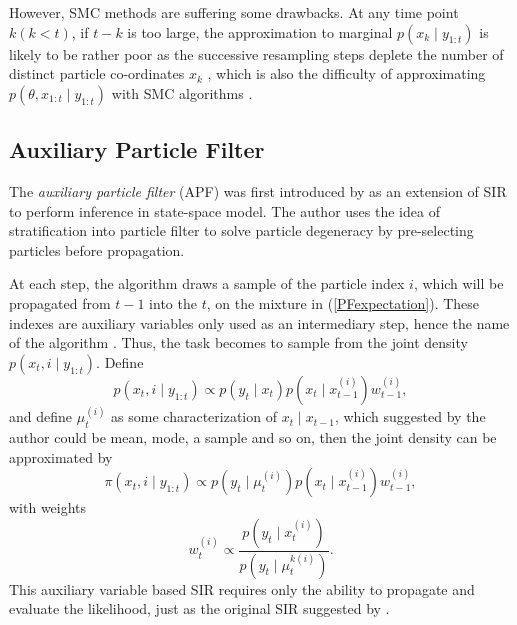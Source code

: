 However, SMC methods are suffering some drawbacks. At any time point $k (k<t)$, if $t-k$ is too large, the approximation to marginal $p(x_k\mid y_{1:t})$ is likely to be rather poor as the successive resampling steps deplete the number of distinct particle co-ordinates $x_k$ \citep{andrieu2010particle}, which is also the difficulty of approximating $p(\theta,x_{1:t}\mid y_{1:t})$ with SMC algorithms 
\citep{andrieu1999sequential, fearnhead2002markov, storvik2002particle}. 




\subsection{Auxiliary Particle Filter}

The \textit{auxiliary particle filter} (APF) was first introduced by \cite{pitt1999filtering} as an extension of SIR to perform inference in state-space model. The author uses the idea of stratification into particle filter to solve particle degeneracy by pre-selecting particles before propagation. 

At each step, the algorithm draws a sample of the particle index $i$, which will be propagated from $t-1$ into the $t$, on the mixture in (\ref{PFexpectation}). These indexes are auxiliary variables only used as an intermediary step, hence the name of the algorithm \citep{pitt1999filtering}. Thus, the task becomes to sample from the joint density $p(x_t,i\mid y_{1:t})$. Define 
\begin{equation}
p(x_t,i\mid y_{1:t})\propto p(y_t\mid x_t)p\left(x_t\mid x_{t-1}^{(i)}\right) w_{t-1}^{(i)}, 
\end{equation}
and define $\mu_t^{(i)}$ as some characterization of $x_t\mid x_{t-1}$, which suggested by the author could be mean, mode, a sample and so on, then the joint density can be approximated by  
\begin{equation}
\pi\left(x_t,i\mid y_{1:t}\right)\propto p\left(y_t\mid \mu_t^{\left(i\right)}\right)p\left(x_t\mid x_{t-1}^{\left(i\right)}\right)w_{t-1}^{\left(i\right)}, 
\end{equation}
with weights
\begin{equation*}
w_t^{\left(i\right)}\propto \frac{ p\left(y_t\mid x_t^{\left(i\right)}\right) }{ p\left(y_t\mid\mu_t^{k\left(i\right)}\right) }.
\end{equation*}
This auxiliary variable based SIR requires only the ability to propagate and evaluate the likelihood, just as the original SIR suggested by \cite{gordon1993novel}.  

